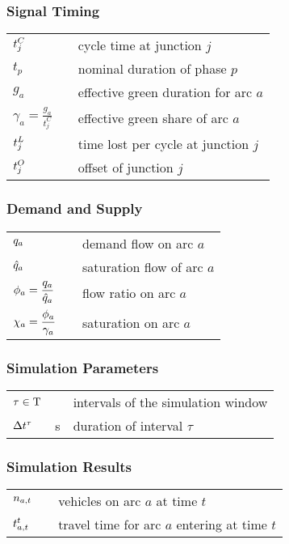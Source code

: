 \subsubsection*{Signal Timing}
\begin{tabu} to \textwidth {X[3,c] X[1,c] X[6,l]}
$ t_{j}^C $ &  & cycle time at junction $j$\\[2pt]
$ t_p   $ &  & nominal duration of phase $p$\\[2pt]
$ g_a   $ &  & effective green duration for arc $a$\\[3pt]
$ \displaystyle \gamma_a = \frac{g_a}{t_j^C} $ & \units{\%} & effective green share of arc $a$\\[2pt]
$ t_{j}^L $ &  & time lost per cycle at junction $j$\\[2pt]
$ t_{j}^O $ &  & offset of junction $j$ \\[2pt]
\end{tabu} 


\subsubsection*{Demand and Supply}
\begin{tabu} to \textwidth {X[3,c] X[1,c] X[6,l]}
$ q_{a} $ &  & demand flow on arc $a$ \\[2pt]
$ \hat{q}_a $ &  & saturation flow of arc $a$ \\[2pt]

$ \displaystyle \phi_a = \frac{q_a}{\hat{q}_a} $ & & flow ratio on arc $a$ \\[2pt]
$ \displaystyle \chi_a = \frac{\phi_a}{\gamma_a} $ & & saturation on arc $a$ \\[2pt]
\end{tabu} 

\subsubsection*{Simulation Parameters}
\begin{tabu} to \textwidth {X[3,c] X[1,c] X[6,l]}
$ \tau \in \mathrm{T} $ &  & intervals of the simulation window \\[2pt]
$ \Delta t^{\tau} $ & s & duration of interval $\tau$\\[2pt]
\end{tabu}

\subsubsection*{Simulation Results}
\begin{tabu} to \textwidth {X[3,c] X[1,c] X[6,l]}
$ n_{a,t} $ &  & vehicles on arc $a$ at time $t$\\[2pt]
$ t_{a,t}^t $ &  & travel time for arc $a$ entering at time $t$ \\[2pt]
\end{tabu}

